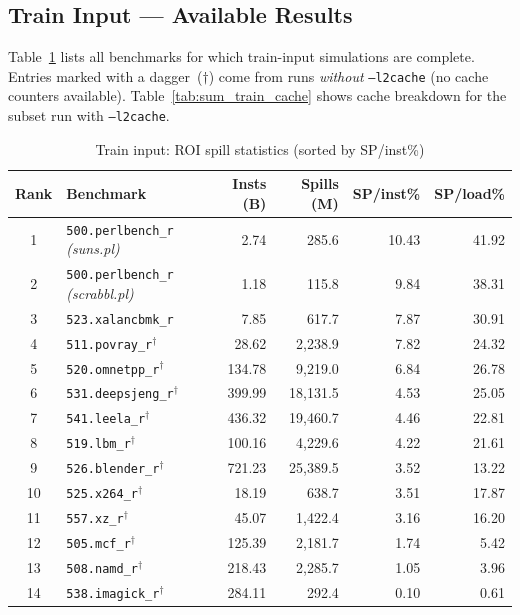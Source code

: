 \documentclass[11pt,a4paper]{article}
\begin{document}
\subsection{Train Input --- Available Results}
\label{subsec:summary_train}

Table~\ref{tab:sum_train_spill} lists all benchmarks for which train-input
simulations are complete.  Entries marked with a dagger~($\dagger$) come from
runs \emph{without} \texttt{--l2cache} (no cache counters available).
Table~\ref{tab:sum_train_cache} shows cache breakdown for the subset run with
\texttt{--l2cache}.

\begin{table}[H]
\centering
\caption{Train input: ROI spill statistics (sorted by SP/inst\%)}
\label{tab:sum_train_spill}
\small
\begin{tabular}{clrrrr}
\toprule
\textbf{Rank} & \textbf{Benchmark} & \textbf{Insts (B)} & \textbf{Spills (M)}
  & \textbf{SP/inst\%} & \textbf{SP/load\%} \\
\midrule
1 & \texttt{500.perlbench\_r} \textit{(suns.pl)} & 2.74 & 285.6 & 10.43 & 41.92 \\
2 & \texttt{500.perlbench\_r} \textit{(scrabbl.pl)} & 1.18 & 115.8 & 9.84 & 38.31 \\
3 & \texttt{523.xalancbmk\_r} & 7.85 & 617.7 & 7.87 & 30.91 \\
4 & \texttt{511.povray\_r}$^\dagger$ & 28.62 & 2,238.9 & 7.82 & 24.32 \\
5 & \texttt{520.omnetpp\_r}$^\dagger$ & 134.78 & 9,219.0 & 6.84 & 26.78 \\
6 & \texttt{531.deepsjeng\_r}$^\dagger$ & 399.99 & 18,131.5 & 4.53 & 25.05 \\
7 & \texttt{541.leela\_r}$^\dagger$ & 436.32 & 19,460.7 & 4.46 & 22.81 \\
8 & \texttt{519.lbm\_r}$^\dagger$ & 100.16 & 4,229.6 & 4.22 & 21.61 \\
9 & \texttt{526.blender\_r}$^\dagger$ & 721.23 & 25,389.5 & 3.52 & 13.22 \\
10 & \texttt{525.x264\_r}$^\dagger$ & 18.19 & 638.7 & 3.51 & 17.87 \\
11 & \texttt{557.xz\_r}$^\dagger$ & 45.07 & 1,422.4 & 3.16 & 16.20 \\
12 & \texttt{505.mcf\_r}$^\dagger$ & 125.39 & 2,181.7 & 1.74 & 5.42 \\
13 & \texttt{508.namd\_r}$^\dagger$ & 218.43 & 2,285.7 & 1.05 & 3.96 \\
14 & \texttt{538.imagick\_r}$^\dagger$ & 284.11 & 292.4 & 0.10 & 0.61 \\
\bottomrule
\end{tabular}
\end{table}
\end{document}
